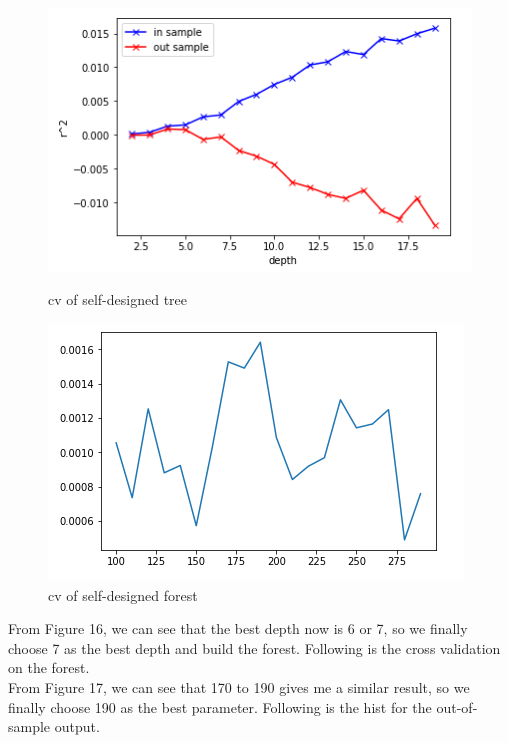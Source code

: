 \documentclass[onecolumn]{article}
\begin{document}
\begin{figure}[htbp]
\centering
\begin{minipage}[t]{0.48\textwidth}
\centering
\includegraphics[scale=0.4]{cv_for_our_tree.png}
\caption{cv of self-designed tree}
\end{minipage}
\begin{minipage}[t]{0.48\textwidth}
\centering
\includegraphics[scale=0.4]{cv_our_forest.png}
\caption{cv of self-designed forest}
\end{minipage}
\end{figure}

\indent From Figure 16, we can see that the best depth now is 6 or 7, so we finally choose 7 as the best depth and build the forest. Following is the cross validation on the forest.\\
\indent From Figure 17, we can see that 170 to 190 gives me a similar result, so we finally choose 190 as the best parameter. Following is the hist for the out-of-sample output.
\end{document}
